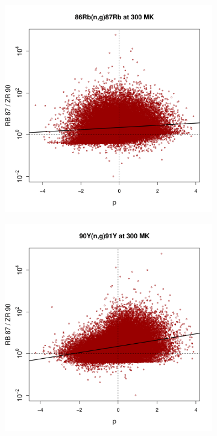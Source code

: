 \begin{figure}[!p]
\centering
\begin{subfigure}[b]{0.495\textwidth}
\centering
\includegraphics[width=\textwidth]{Chapter-3/figs/CorrRB87ZR90_86Rb_n_g_87Rb_300MK.png}  
\end{subfigure}
\hfill
\begin{subfigure}[b]{0.495\textwidth}  
\centering 
\includegraphics[width=\textwidth]{Chapter-3/figs/CorrRB87ZR90_90Y_n_g_91Y_300MK.png}

\end{subfigure}
\end{figure}
